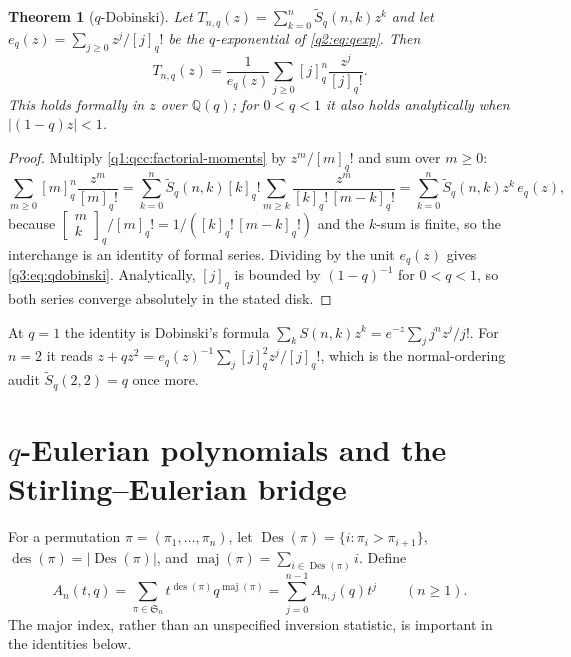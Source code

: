 \documentclass[11pt,a4paper,oneside,openany]{book}
\newtheorem{theorem}{Theorem}[chapter]
\theoremstyle{definition}
\theoremstyle{remark}
\newcommand{\Q}{\mathbb Q}
\newcommand{\GB}[3][q]{\begin{bmatrix}#2\\#3\end{bmatrix}_{#1}}
\newcommand{\des}{\operatorname{des}}
\newcommand{\maj}{\operatorname{maj}}
\begin{document}
\begin{theorem}[\(q\)-Dobinski]\label{q3:thm:qdobinski}
Let \(T_{n,q}(z)=\sum_{k=0}^n\widetilde S_q(n,k)z^k\) and let
\(e_q(z)=\sum_{j\ge0}z^j/[j]_q!\) be the \(q\)-exponential of
\eqref{q2:eq:qexp}. Then
\begin{equation}\label{q3:eq:qdobinski}
 T_{n,q}(z)=\frac1{e_q(z)}\sum_{j\ge0}[j]_q^n\frac{z^j}{[j]_q!}.
\end{equation}
This holds formally in \(z\) over \(\Q(q)\); for \(0<q<1\) it also holds
analytically when \(|(1-q)z|<1\).
\end{theorem}
\begin{proof}
Multiply \eqref{q1:qcc:factorial-moments} by \(z^m/[m]_q!\) and sum over
\(m\ge0\):
\[
 \sum_{m\ge0}[m]_q^n\frac{z^m}{[m]_q!}
 =\sum_{k=0}^n\widetilde S_q(n,k)[k]_q!
   \sum_{m\ge k}\frac{z^m}{[k]_q!\,[m-k]_q!}
 =\sum_{k=0}^n\widetilde S_q(n,k)z^k\,e_q(z),
\]
because \(\GB mk/[m]_q!=1/([k]_q!\,[m-k]_q!)\) and the \(k\)-sum is finite,
so the interchange is an identity of formal series. Dividing by the unit
\(e_q(z)\) gives \eqref{q3:eq:qdobinski}. Analytically, \([j]_q\) is bounded
by \((1-q)^{-1}\) for \(0<q<1\), so both series converge absolutely in the
stated disk.
\end{proof}
At \(q=1\) the identity is Dobinski's formula
\(\sum_kS(n,k)z^k=e^{-z}\sum_jj^nz^j/j!\). For \(n=2\) it reads
\(z+qz^2=e_q(z)^{-1}\sum_j[j]_q^2z^j/[j]_q!\), which is the normal-ordering
audit \(\widetilde S_q(2,2)=q\) once more.

\chapter{\texorpdfstring{$q$}{q}-Eulerian polynomials and the Stirling--Eulerian bridge}
\label{q3:sec:eulerian}
For a permutation $\pi=(\pi_1,\ldots,\pi_n)$, let
$\operatorname{Des}(\pi)=\{i:\pi_i>\pi_{i+1}\}$,
$\des(\pi)=|\operatorname{Des}(\pi)|$, and
$\maj(\pi)=\sum_{i\in\operatorname{Des}(\pi)}i$. Define
\begin{equation}
 A_n(t,q)=\sum_{\pi\in\mathfrak S_n}t^{\des(\pi)}q^{\maj(\pi)}
       =\sum_{j=0}^{n-1}A_{n,j}(q)t^j \qquad(n\ge1).
 \label{q3:eq:qeulerian}
\end{equation}
The major index, rather than an unspecified inversion statistic, is
important in the identities below.
\end{document}
